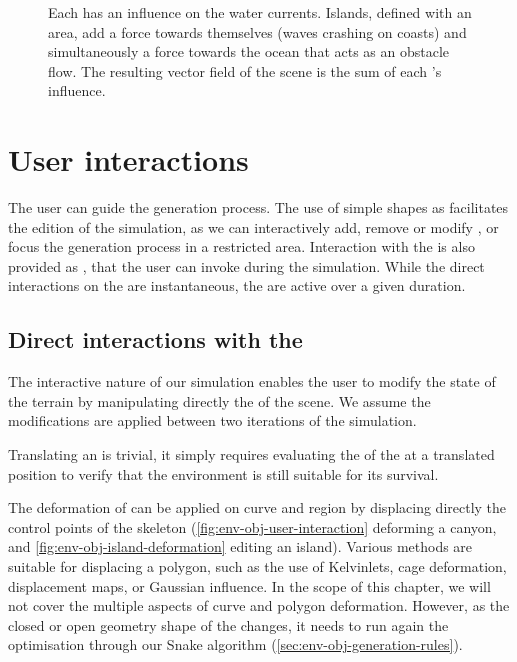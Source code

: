 \begin{figure}
    \caption{Each  has an influence on the water currents. Islands, defined with an area, add a force towards themselves (waves crashing on coasts) and simultaneously a force towards the ocean that acts as an obstacle flow. The resulting vector field of the scene is the sum of each 's influence.}
    \label{fig:env-obj-island-flowfield}
\end{figure}


\section{User interactions}
\label{sec:env-obj-interaction}
The user can guide the generation process. The use of simple shapes as  facilitates the edition of the simulation, as we can interactively add, remove or modify , or focus the generation process in a restricted area. Interaction with the  is also provided as , that the user can invoke during the simulation. While the direct interactions on the  are instantaneous, the  are active over a given duration.

\subsection{Direct interactions with the }
\label{sec:env-obj-manual-interaction}
The interactive nature of our simulation enables the user to modify the state of the terrain by manipulating directly the  of the scene. We assume the modifications are applied between two iterations of the simulation.

Translating an  is trivial, it simply requires evaluating the  of the  at a translated position to verify that the environment is still suitable for its survival.

The deformation of  can be applied on curve and region  by displacing directly the control points of the skeleton (\cref{fig:env-obj-user-interaction} deforming a canyon, and \cref{fig:env-obj-island-deformation} editing an island). Various methods are suitable for displacing a polygon, such as the use of Kelvinlets, cage deformation, displacement maps, or Gaussian influence. In the scope of this chapter, we will not cover the multiple aspects of curve and polygon deformation. However, as the closed or open geometry shape of the  changes, it needs to run again the  optimisation through our Snake algorithm (\cref{sec:env-obj-generation-rules}).

